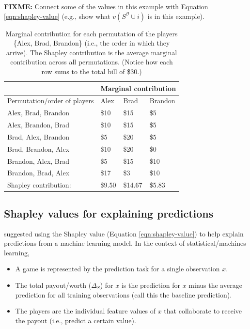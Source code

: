 \textbf{FIXME:} Connect some of the values in this example with Equation
\ref{eqn:shapley-value} (e.g., show what
\(v\left(S^\mathcal{O} \cup i\right)\) is in this example).

\begin{table}[!htb]
\centering
\begin{tabular}{@{}llll@{}}
\toprule
                      & \multicolumn{3}{l}{Marginal contribution} \\ \midrule
Permutation/order of players           & Alex        & Brad         & Brandon      \\ \midrule
Alex, Brad, Brandon   & \$10        & \$15         & \$5          \\ 
Alex, Brandon, Brad   & \$10        & \$15         & \$5          \\
Brad, Alex, Brandon   & \$5         & \$20         & \$5          \\
Brad, Brandon, Alex   & \$10        & \$20         & \$0          \\
Brandon, Alex, Brad   & \$5         & \$15         & \$10         \\
Brandon, Brad, Alex   & \$17        & \$3          & \$10         \\ \midrule
Shapley contribution: & \$9.50      & \$14.67      & \$5.83       \\ \bottomrule
\end{tabular}
\caption{Marginal contribution for each permutation of the players \{Alex, Brad, Brandon\} (i.e., the order in which they arrive). The Shapley contribution is the average marginal contribution across all permutations. (Notice how each row sums to the total bill of \$30.) \label{tab:bar}}
\end{table}

\subsection{Shapley values for explaining predictions}

\citet{strumbelj-2014-explaining} suggested using the Shapley value
(Equation \eqref{eqn:shapley-value}) to help explain predictions from a
machine learning model. In the context of statistical/machines learning,

\begin{itemize}

  \item A game is represented by the prediction task for a single observation $x$.
  
  \item The total payout/worth ($\Delta_S$) for $x$ is the prediction for $x$ minus the average prediction for all training observations (call this the baseline prediction).
  
  \item The players are the individual feature values of $x$ that collaborate to receive the payout (i.e., predict a certain value).
  
\end{itemize}

